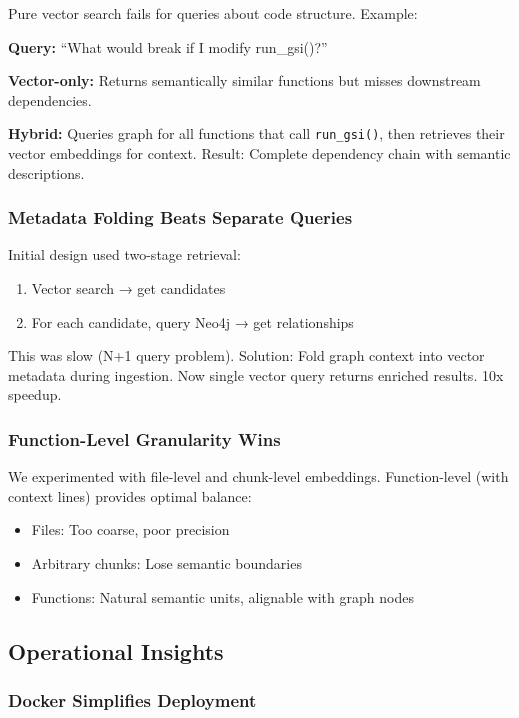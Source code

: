 \documentclass[11pt,letterpaper]{article}
\begin{document}
Pure vector search fails for queries about code structure. Example:

\textbf{Query:} ``What would break if I modify run\_gsi()?''

\textbf{Vector-only:} Returns semantically similar functions but misses downstream dependencies.

\textbf{Hybrid:} Queries graph for all functions that call \texttt{run\_gsi()}, then retrieves their vector embeddings for context. Result: Complete dependency chain with semantic descriptions.

\subsubsection{Metadata Folding Beats Separate Queries}

Initial design used two-stage retrieval:
\begin{enumerate}
    \item Vector search → get candidates
    \item For each candidate, query Neo4j → get relationships
\end{enumerate}

This was slow (N+1 query problem). Solution: Fold graph context into vector metadata during ingestion. Now single vector query returns enriched results. 10x speedup.

\subsubsection{Function-Level Granularity Wins}

We experimented with file-level and chunk-level embeddings. Function-level (with context lines) provides optimal balance:
\begin{itemize}
    \item Files: Too coarse, poor precision
    \item Arbitrary chunks: Lose semantic boundaries
    \item Functions: Natural semantic units, alignable with graph nodes
\end{itemize}

\subsection{Operational Insights}

\subsubsection{Docker Simplifies Deployment}
\end{document}

